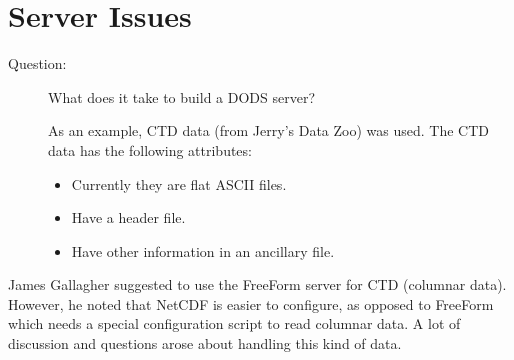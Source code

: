 \section{Server Issues}

\begin{description}
\item[Question:]  What does it take to build a DODS server?

As an example, CTD data (from Jerry's Data Zoo) was used.  The CTD data has the 
following attributes:
\begin{itemize}
\item Currently they are flat ASCII files.
\item Have a header file.
\item Have other information in an ancillary file.
\end{itemize}
\end{description}

James Gallagher suggested to use the FreeForm server for CTD (columnar
data).  However, he noted that NetCDF is easier to configure, as
opposed to FreeForm which needs a special configuration script to read
columnar data.  A lot of discussion and questions arose about handling
this kind of data.

